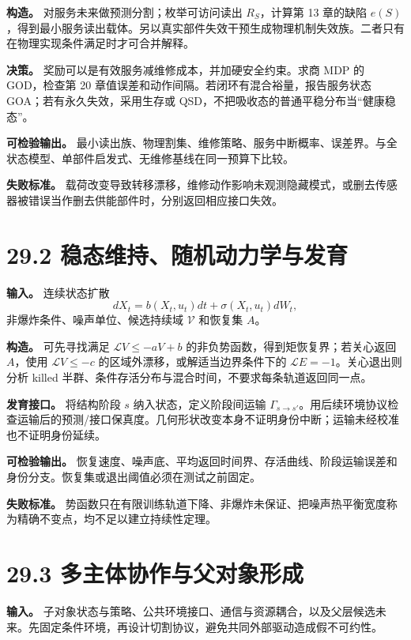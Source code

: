 \documentclass[
  11pt,
  oneside]{book}
\begin{document}
\textbf{构造。} 对服务未来做预测分割；枚举可访问读出 \(R_S\)，计算第 13 章的缺陷 \(e(S)\)，得到最小服务读出载体。另以真实部件失效干预生成物理机制失效族。二者只有在物理实现条件满足时才可合并解释。

\textbf{决策。} 奖励可以是有效服务减维修成本，并加硬安全约束。求商 MDP 的 GOD，检查第 20 章值误差和动作间隔。若闭环有混合裕量，报告服务状态 GOA；若有永久失效，采用生存或 QSD，不把吸收态的普通平稳分布当``健康稳态''。

\textbf{可检验输出。} 最小读出族、物理割集、维修策略、服务中断概率、误差界。与全状态模型、单部件启发式、无维修基线在同一预算下比较。

\textbf{失败标准。} 载荷改变导致转移漂移，维修动作影响未观测隐藏模式，或删去传感器被错误当作删去供能部件时，分别返回相应接口失效。

\section{29.2 稳态维持、随机动力学与发育}\label{ux7a33ux6001ux7ef4ux6301ux968fux673aux52a8ux529bux5b66ux4e0eux53d1ux80b2}

\textbf{输入。} 连续状态扩散 \[dX_t=b(X_t,u_t)dt+\sigma(X_t,u_t)dW_t,\] 非爆炸条件、噪声单位、候选持续域 \(\mathcal V\) 和恢复集 \(A\)。

\textbf{构造。} 可先寻找满足 \(\mathcal LV\le-aV+b\) 的非负势函数，得到矩恢复界；若关心返回 \(A\)，使用 \(\mathcal LV\le-c\) 的区域外漂移，或解适当边界条件下的 \(\mathcal LE=-1\)。关心退出则分析 killed 半群、条件存活分布与混合时间，不要求每条轨道返回同一点。

\textbf{发育接口。} 将结构阶段 \(s\) 纳入状态，定义阶段间运输 \(\Gamma_{s\to s'}\)。用后续环境协议检查运输后的预测/接口保真度。几何形状改变本身不证明身份中断；运输未经校准也不证明身份延续。

\textbf{可检验输出。} 恢复速度、噪声底、平均返回时间界、存活曲线、阶段运输误差和身份分支。恢复集或退出阈值必须在测试之前固定。

\textbf{失败标准。} 势函数只在有限训练轨道下降、非爆炸未保证、把噪声热平衡宽度称为精确不变点，均不足以建立持续性定理。

\section{29.3 多主体协作与父对象形成}\label{ux591aux4e3bux4f53ux534fux4f5cux4e0eux7236ux5bf9ux8c61ux5f62ux6210}

\textbf{输入。} 子对象状态与策略、公共环境接口、通信与资源耦合，以及父层候选未来。先固定条件环境，再设计切割协议，避免共同外部驱动造成假不可约性。
\end{document}

